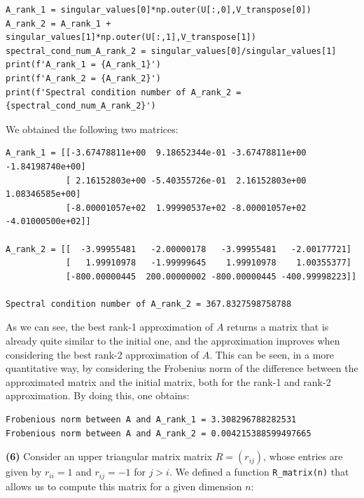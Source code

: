 \documentclass[a4paper,11pt]{article}
\begin{document}
\begin{verbatim}
A_rank_1 = singular_values[0]*np.outer(U[:,0],V_transpose[0])
A_rank_2 = A_rank_1 + singular_values[1]*np.outer(U[:,1],V_transpose[1])
spectral_cond_num_A_rank_2 = singular_values[0]/singular_values[1]
print(f'A_rank_1 = {A_rank_1}')
print(f'A_rank_2 = {A_rank_2}')
print(f'Spectral condition number of A_rank_2 = {spectral_cond_num_A_rank_2}')
\end{verbatim}

\noindent We obtained the following two matrices:

\begin{verbatim}
A_rank_1 = [[-3.67478811e+00  9.18652344e-01 -3.67478811e+00 -1.84198740e+00]
            [ 2.16152803e+00 -5.40355726e-01  2.16152803e+00  1.08346585e+00]
            [-8.00001057e+02  1.99990537e+02 -8.00001057e+02 -4.01000500e+02]]

A_rank_2 = [[  -3.99955481   -2.00000178   -3.99955481   -2.00177721]
            [   1.99910978   -1.99999645    1.99910978    1.00355377]
            [-800.00000445  200.00000002 -800.00000445 -400.99998223]]

Spectral condition number of A_rank_2 = 367.8327598758788
\end{verbatim}

\noindent As we can see, the best rank-1 approximation of $A$ returns a matrix that is already quite similar to the initial one, and the approximation improves when considering the best rank-2 approximation of $A$. This can be seen, in a more quantitative way, by considering the Frobenius norm of the difference between the approximated matrix and the initial matrix, both for the rank-1 and rank-2 approximation. By doing this, one obtains:

\begin{verbatim}
Frobenious norm between A and A_rank_1 = 3.308296788282531
Frobenious norm between A and A_rank_2 = 0.004215388599497665
\end{verbatim}

\noindent \textbf{(6)} Consider an upper triangular matrix matrix $R = (r_{ij})$, whose entries are given by $r_{ii} = 1$ and $r_{ij} = -1$ for $j>i$. We defined a function \texttt{R_matrix(n)} that allows us to compute this matrix for a given dimension $n$:
\end{document}
